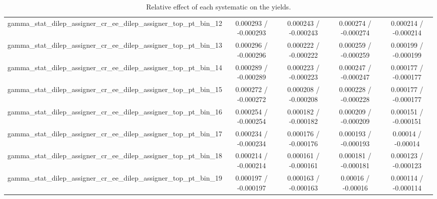 \documentclass[10pt]{article}
\begin{document}
\begin{table}[htbp]
\begin{center}
\begin{tabular}{|c|c|c|c|c|}
  gamma_stat_dilep_assigner_cr_ee_dilep_assigner_top_pt_bin_12 & 0.000293 / -0.000293 & 0.000243 / -0.000243 & 0.000274 / -0.000274 & 0.000214 / -0.000214 \\ 
  gamma_stat_dilep_assigner_cr_ee_dilep_assigner_top_pt_bin_13 & 0.000296 / -0.000296 & 0.000222 / -0.000222 & 0.000259 / -0.000259 & 0.000199 / -0.000199 \\ 
  gamma_stat_dilep_assigner_cr_ee_dilep_assigner_top_pt_bin_14 & 0.000289 / -0.000289 & 0.000223 / -0.000223 & 0.000247 / -0.000247 & 0.000177 / -0.000177 \\ 
  gamma_stat_dilep_assigner_cr_ee_dilep_assigner_top_pt_bin_15 & 0.000272 / -0.000272 & 0.000208 / -0.000208 & 0.000228 / -0.000228 & 0.000177 / -0.000177 \\ 
  gamma_stat_dilep_assigner_cr_ee_dilep_assigner_top_pt_bin_16 & 0.000254 / -0.000254 & 0.000182 / -0.000182 & 0.000209 / -0.000209 & 0.000151 / -0.000151 \\ 
  gamma_stat_dilep_assigner_cr_ee_dilep_assigner_top_pt_bin_17 & 0.000234 / -0.000234 & 0.000176 / -0.000176 & 0.000193 / -0.000193 & 0.00014 / -0.00014 \\ 
  gamma_stat_dilep_assigner_cr_ee_dilep_assigner_top_pt_bin_18 & 0.000214 / -0.000214 & 0.000161 / -0.000161 & 0.000181 / -0.000181 & 0.000123 / -0.000123 \\ 
  gamma_stat_dilep_assigner_cr_ee_dilep_assigner_top_pt_bin_19 & 0.000197 / -0.000197 & 0.000163 / -0.000163 & 0.00016 / -0.00016 & 0.000114 / -0.000114 \\ 
\hline 
\end{tabular} 
\caption{Relative effect of each systematic on the yields.} 
\end{center} 
\end{table} 
\end{document}
